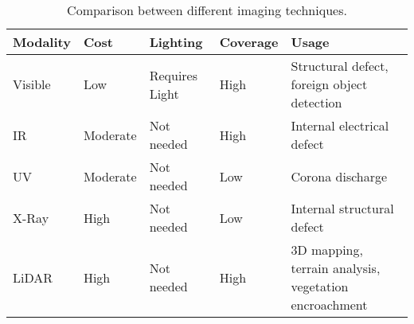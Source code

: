 \begin{table*}[htb]
\scriptsize
\caption{Comparison between different imaging techniques.}
\label{tab:imaging_techniques}
\centering
\begin{tabular}{P{.1} P{.1} P{.15} P{.075} P{.425}}
\hline
Modality & Cost & Lighting & Coverage & Usage \\
\hline
Visible & Low & Requires Light & High & Structural defect, foreign object detection \\
IR & Moderate & Not   needed & High & Internal electrical defect \\
UV & Moderate & Not needed & Low & Corona discharge \\
X-Ray & High & Not needed & Low & Internal structural defect \\
LiDAR & High & Not needed & High & 3D mapping, terrain analysis, vegetation encroachment \\
\hline
\end{tabular}
\end{table*}

